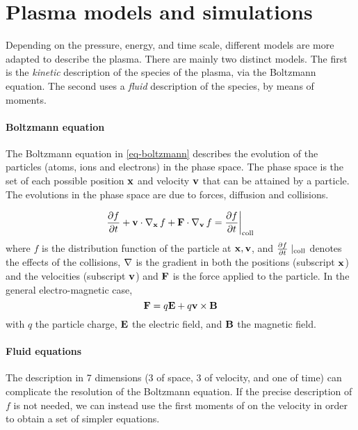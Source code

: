 

\section*{Plasma models and simulations}
\label{sec-simulations}

Depending on the pressure, energy, and time scale, different models are more adapted to describe the plasma.
There are mainly two distinct models.
The first is the \emph{kinetic} description of the species of the plasma, via the Boltzmann equation.
The second uses a \emph{fluid} description of the species, by means of moments.
% 


\paragraph{Boltzmann equation \\}
The Boltzmann equation in \cref{eq-boltzmann} describes the evolution of the particles (atoms, ions and electrons) in the phase space.
The phase space is the set of each possible position ${\mathbf x}$ and velocity ${\mathbf v}$ that can be attained by a particle.
The evolutions in the phase space are due to forces, diffusion and collisions.

\begin{equation} \label{eq-boltzmann}
\frac{\partial f}{\partial t}  + {\mathbf v} \cdot \operatorname{{\mathbf \nabla}}_{{\mathbf x}} f + {\mathbf F} \cdot  \operatorname{{\mathbf \nabla}}_{{\mathbf v}} f = \frac{\partial f}{\partial t}  \bigg\vert_{\rm coll} 
\end{equation}
where $f$ is the distribution function of the particle at ${\mathbf x}, {\mathbf v}$, and $\frac{\partial f}{\partial t}\mid_{\rm coll}$ denotes the effects of the collisions, $\operatorname{{\mathbf \nabla}}$ is the gradient in both the positions (subscript ${\mathbf x}$) and the velocities (subscript ${\mathbf v}$)  and ${\mathbf F}$ is the force applied to the particle.
In the general electro-magnetic case,
\begin{equation*} \label{eq-forceEM}
  {\mathbf F} =  q {\mathbf E} + q {\mathbf v} \times {\mathbf B}
\end{equation*}
with $q$ the particle charge, ${\mathbf E}$ the electric field, and ${\mathbf B}$ the magnetic field.

\paragraph{Fluid equations \\}
The description in 7 dimensions (3 of space, 3 of velocity, and one of time) can complicate the resolution of the Boltzmann equation.
If the precise description of $f$ is not needed, we can instead use the first moments of  on the velocity in order to obtain a set of simpler equations.

